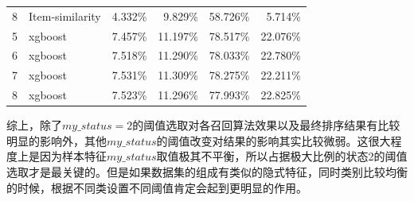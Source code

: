 \begin{enumerate}
\begin{table}[htbp]
{\begin{tabular}{rlrrrr}
            8    & Item-similarity & 4.332\% & 9.829\% & 58.726\% & 5.714\% \\
            5    & xgboost & 7.457\% & 11.197\% & 78.517\% & 22.076\% \\
            6    & xgboost & 7.518\% & 11.290\% & 78.033\% & 22.780\% \\
            7    & xgboost & 7.531\% & 11.309\% & 78.275\% & 22.211\% \\
            8    & xgboost & 7.523\% & 11.296\% & 77.993\% & 22.825\% \\
            \bottomrule
        \end{tabular}}%
        \label{tab:status=4}%
      \end{table}%
    \end{enumerate}

    综上，除了$my\_status=2$的阈值选取对各召回算法效果以及最终排序结果有比较明显的影响外，其他$my\_status$的阈值改变对结果的影响其实比较微弱。这很大程度上是因为样本特征$my\_status$取值极其不平衡，所以占据极大比例的状态2的阈值选取才是最关键的。但是如果数据集的组成有类似的隐式特征，同时类别比较均衡的时候，根据不同类设置不同阈值肯定会起到更明显的作用。